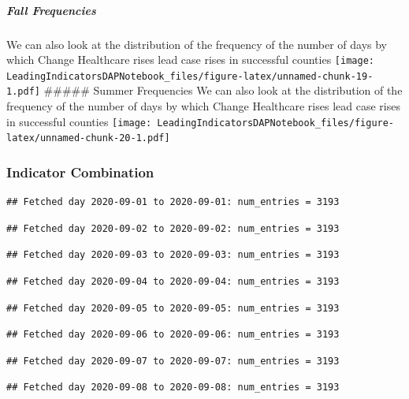 \documentclass[]{article}
\let\oldsubparagraph\subparagraph
\renewcommand{\subparagraph}[1]{\oldsubparagraph{#1}\mbox{}}
\begin{document}
\hypertarget{fall-frequencies}{%
\subparagraph{Fall Frequencies}\label{fall-frequencies}}

We can also look at the distribution of the frequency of the number of
days by which Change Healthcare rises lead case rises in successful
counties
\texttt{[image: LeadingIndicatorsDAPNotebook\_files/figure-latex/unnamed-chunk-19-1.pdf]}
\#\#\#\#\# Summer Frequencies We can also look at the distribution of
the frequency of the number of days by which Change Healthcare rises
lead case rises in successful counties
\texttt{[image: LeadingIndicatorsDAPNotebook\_files/figure-latex/unnamed-chunk-20-1.pdf]}

\hypertarget{indicator-combination}{%
\subsubsection{Indicator Combination}\label{indicator-combination}}

\begin{verbatim}
## Fetched day 2020-09-01 to 2020-09-01: num_entries = 3193
\end{verbatim}

\begin{verbatim}
## Fetched day 2020-09-02 to 2020-09-02: num_entries = 3193
\end{verbatim}

\begin{verbatim}
## Fetched day 2020-09-03 to 2020-09-03: num_entries = 3193
\end{verbatim}

\begin{verbatim}
## Fetched day 2020-09-04 to 2020-09-04: num_entries = 3193
\end{verbatim}

\begin{verbatim}
## Fetched day 2020-09-05 to 2020-09-05: num_entries = 3193
\end{verbatim}

\begin{verbatim}
## Fetched day 2020-09-06 to 2020-09-06: num_entries = 3193
\end{verbatim}

\begin{verbatim}
## Fetched day 2020-09-07 to 2020-09-07: num_entries = 3193
\end{verbatim}

\begin{verbatim}
## Fetched day 2020-09-08 to 2020-09-08: num_entries = 3193
\end{verbatim}
\end{document}
